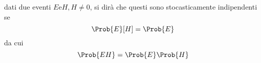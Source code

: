 \documentclass{subfiles}
\begin{document}
\begin{Definition*}
    dati due eventi $E \text{e} H, H \neq 0$, si dirà che questi sono stocasticamente indipendenti se
    $$
        \Prob{E}[H] = \Prob{E}
    $$
    da cui
    $$
        \Prob{EH} = \Prob{E} \Prob{H}
    $$
\end{Definition*}
\end{document}
